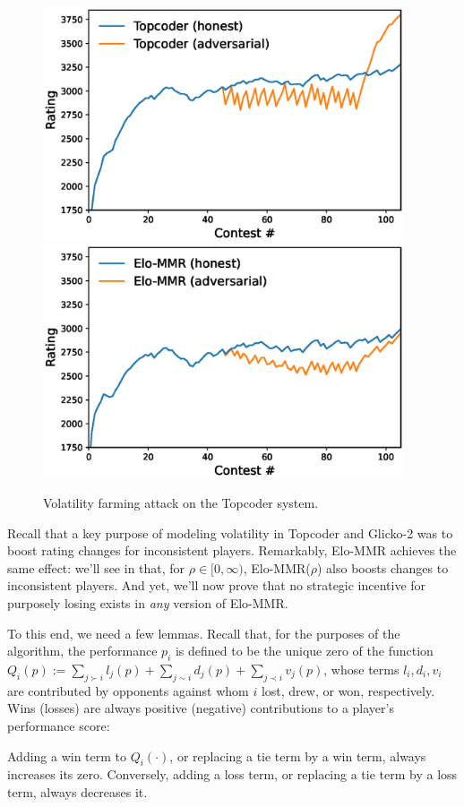 \begin{figure}
\begin{minipage}{0.50\textwidth}
    \includegraphics[width=0.95\textwidth]{images/topcoder.eps}
    \includegraphics[width=0.95\textwidth]{images/elo-mmr.eps}
\end{minipage}
    \caption{Volatility farming attack on the Topcoder system.}
    \label{fig:topcoder-gaming}
\end{figure}

Recall that a key purpose of modeling volatility in Topcoder and Glicko-2 was to boost rating changes for inconsistent players. Remarkably, Elo-MMR achieves the same effect: we'll see in  that, for $\rho\in [0,\infty)$, Elo-MMR($\rho$) also boosts changes to inconsistent players. And yet, we'll now prove that no strategic incentive for purposely losing exists in \emph{any} version of Elo-MMR.

To this end, we need a few lemmas. Recall that, for the purposes of the algorithm, the performance $p_i$ is defined to be the unique zero of the function $Q_i(p) := \sum_{j \succ i} l_j(p) + \sum_{j \sim i} d_j(p) + \sum_{j \prec i} v_j(p)$, whose terms $l_i,d_i,v_i$ are contributed by opponents against whom $i$ lost, drew, or won, respectively. Wins (losses) are always positive (negative) contributions to a player's performance score:
\begin{lemma}
\label{lem:mono-term}
Adding a win term to $Q_i(\cdot)$, or replacing a tie term by a win term, always increases its zero. Conversely, adding a loss term, or replacing a tie term by a loss term, always decreases it.
\end{lemma}

